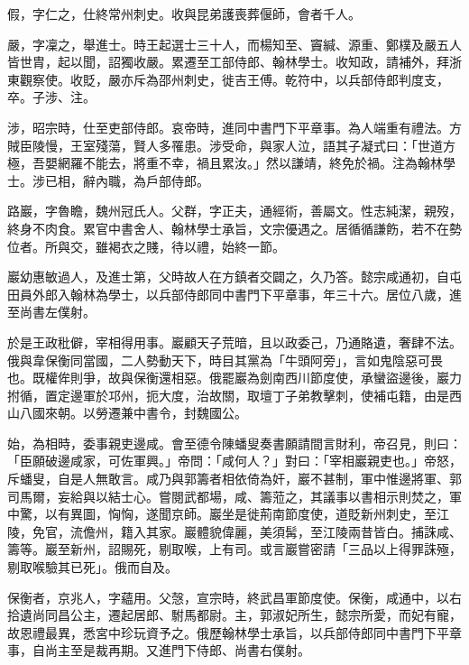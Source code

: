 \begin{pinyinscope}
 假，字仁之，仕終常州刺史。收與昆弟護喪葬偃師，會者千人。



 嚴，字凜之，舉進士。時王起選士三十人，而楊知至、竇緘、源重、鄭樸及嚴五人皆世胄，起以聞，詔獨收嚴。累遷至工部侍郎、翰林學士。收知政，請補外，拜浙東觀察使。收貶，嚴亦斥為邵州刺史，徙吉王傅。乾符中，以兵部侍郎判度支，卒。子涉、注。



 涉，昭宗時，仕至吏部侍郎。哀帝時，進同中書門下平章事。為人端重有禮法。方賊臣陵慢，王室殘蕩，賢人多罹患。涉受命，與家人泣，語其子凝式曰：「世道方極，吾嬰網羅不能去，將重不幸，禍且累汝。」然以謙靖，終免於禍。注為翰林學士。涉已相，辭內職，為戶部侍郎。



 路巖，字魯瞻，魏州冠氏人。父群，字正夫，通經術，善屬文。性志純潔，親歿，終身不肉食。累官中書舍人、翰林學士承旨，文宗優遇之。居循循謙飭，若不在勢位者。所與交，雖褐衣之賤，待以禮，始終一節。



 巖幼惠敏過人，及進士第，父時故人在方鎮者交闢之，久乃答。懿宗咸通初，自屯田員外郎入翰林為學士，以兵部侍郎同中書門下平章事，年三十六。居位八歲，進至尚書左僕射。



 於是王政秕僻，宰相得用事。巖顧天子荒暗，且以政委己，乃通賂遺，奢肆不法。俄與韋保衡同當國，二人勢動天下，時目其黨為「牛頭阿旁」，言如鬼陰惡可畏也。既權侔則爭，故與保衡還相惡。俄罷巖為劍南西川節度使，承蠻盜邊後，巖力拊循，置定邊軍於邛州，扼大度，治故關，取壇丁子弟教擊刺，使補屯籍，由是西山八國來朝。以勞遷兼中書令，封魏國公。



 始，為相時，委事親吏邊咸。會至德令陳蟠叟奏書願請間言財利，帝召見，則曰：「臣願破邊咸家，可佐軍興。」帝問：「咸何人？」對曰：「宰相巖親吏也。」帝怒，斥蟠叟，自是人無敢言。咸乃與郭籌者相依倚為奸，巖不甚制，軍中惟邊將軍、郭司馬爾，妄給與以結士心。嘗閱武都場，咸、籌蒞之，其議事以書相示則焚之，軍中驚，以有異圖，恟恟，遂聞京師。巖坐是徙荊南節度使，道貶新州刺史，至江陵，免官，流儋州，籍入其家。巖體貌偉麗，美須髯，至江陵兩昔皆白。捕誅咸、籌等。巖至新州，詔賜死，剔取喉，上有司。或言巖嘗密請「三品以上得罪誅殛，剔取喉驗其已死」。俄而自及。



 保衡者，京兆人，字蘊用。父愨，宣宗時，終武昌軍節度使。保衡，咸通中，以右拾遺尚同昌公主，遷起居郎、駙馬都尉。主，郭淑妃所生，懿宗所愛，而妃有寵，故恩禮最異，悉宮中珍玩資予之。俄歷翰林學士承旨，以兵部侍郎同中書門下平章事，自尚主至是裁再期。又進門下侍郎、尚書右僕射。




\end{pinyinscope}
